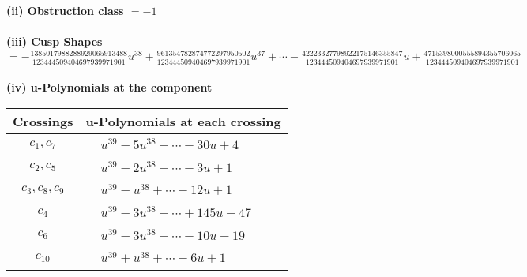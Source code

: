 \documentclass[1p]{elsarticle_modified}
\theoremstyle{definition}
\begin{document}
\flushleft \textbf{(ii) Obstruction class $= -1$}\\~\\
\flushleft \textbf{(iii) Cusp Shapes $= -\frac{1385017988288929065913488}{123444509404697939971901} u^{38}+\frac{961354782874772297950502}{123444509404697939971901} u^{37}+\cdots-\frac{42223327798922175146355847}{123444509404697939971901} u+\frac{4715398000555894355706065}{123444509404697939971901}$}\\~\\
\newpage\renewcommand{\arraystretch}{1}
\flushleft \textbf{(iv) u-Polynomials at the component}\newline \\
\begin{tabular}{m{50pt}|m{274pt}}
Crossings & \hspace{64pt}u-Polynomials at each crossing \\
\hline $$\begin{aligned}c_{1},c_{7}\end{aligned}$$&$\begin{aligned}
&u^{39}-5 u^{38}+\cdots-30 u+4
\end{aligned}$\\
\hline $$\begin{aligned}c_{2},c_{5}\end{aligned}$$&$\begin{aligned}
&u^{39}-2 u^{38}+\cdots-3 u+1
\end{aligned}$\\
\hline $$\begin{aligned}c_{3},c_{8},c_{9}\end{aligned}$$&$\begin{aligned}
&u^{39}- u^{38}+\cdots-12 u+1
\end{aligned}$\\
\hline $$\begin{aligned}c_{4}\end{aligned}$$&$\begin{aligned}
&u^{39}-3 u^{38}+\cdots+145 u-47
\end{aligned}$\\
\hline $$\begin{aligned}c_{6}\end{aligned}$$&$\begin{aligned}
&u^{39}-3 u^{38}+\cdots-10 u-19
\end{aligned}$\\
\hline $$\begin{aligned}c_{10}\end{aligned}$$&$\begin{aligned}
&u^{39}+u^{38}+\cdots+6 u+1
\end{aligned}$\\
\hline
\end{tabular}\\~\\
\end{document}
